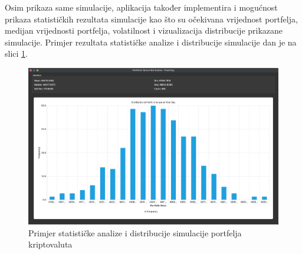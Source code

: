 \documentclass[zavrsnirad, upload]{fer}
\begin{document}
Osim prikaza same simulacije, aplikacija također
implementira i mogućnost prikaza statističkih
rezultata simulacije kao što su očekivana vrijednost portfelja, medijan
vrijednosti portfelja, volatilnost
i vizualizacija distribucije prikazane simulacije.
Primjer rezultata statističke analize i distribucije
simulacije dan je na slici \ref{fig:distribution_example}.
\begin{figure}[H]
    \centering
    \includegraphics[width=1.0\textwidth]{Figures/distribution_example.png}
    \caption{Primjer statističke analize i distribucije simulacije portfelja kriptovaluta}
    \label{fig:distribution_example}
\end{figure}
\end{document}
